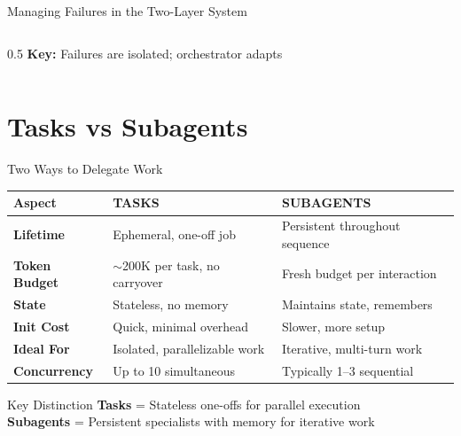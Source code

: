 \documentclass[aspectratio=169,11pt]{beamer}
\begin{document}
\begin{frame}{Managing Failures in the Two-Layer System}
\begin{columns}[T]
\begin{column}{0.5\textwidth}
\textbf{Key:} Failures are isolated; orchestrator adapts
\end{column}
\end{columns}
\end{frame}

\section{Tasks vs Subagents}

\begin{frame}{Two Ways to Delegate Work}
\begin{center}
\begin{tabular}{>{\bfseries}l p{4.5cm} p{4.5cm}}
\toprule
\textbf{Aspect} & \textbf{TASKS} & \textbf{SUBAGENTS} \\
\midrule
Lifetime & Ephemeral, one-off job & Persistent throughout sequence \\
\addlinespace
Token Budget & $\sim$200K per task, no carryover & Fresh budget per interaction \\
\addlinespace
State & Stateless, no memory & Maintains state, remembers \\
\addlinespace
Init Cost & Quick, minimal overhead & Slower, more setup \\
\addlinespace
Ideal For & Isolated, parallelizable work & Iterative, multi-turn work \\
\addlinespace
Concurrency & Up to 10 simultaneous & Typically 1--3 sequential \\
\bottomrule
\end{tabular}
\end{center}

\vspace{0.3cm}
\begin{block}{Key Distinction}
\textbf{Tasks} = Stateless one-offs for parallel execution\\
\textbf{Subagents} = Persistent specialists with memory for iterative work
\end{block}
\end{frame}
\end{document}
